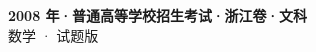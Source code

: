 \documentclass[zihao=-4, a4paper]{ctexart}
\begin{document}
\begin{center}
  {\Large\bfseries 2008 年·普通高等学校招生考试·浙江卷·文科}\\[4pt]
  {\large 数学 · 试题版}
\end{center}
\medskip
{}

\end{document}
